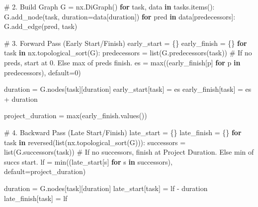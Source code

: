 \documentclass[
  letterpaper,
  DIV=11,
  numbers=noendperiod]{scrreprt}
\newenvironment{Shaded}{\begin{snugshade}}{\end{snugshade}}
\newcommand{\BuiltInTok}[1]{\textcolor[rgb]{0.00,0.23,0.31}{#1}}
\newcommand{\CommentTok}[1]{\textcolor[rgb]{0.37,0.37,0.37}{#1}}
\newcommand{\ControlFlowTok}[1]{\textcolor[rgb]{0.00,0.23,0.31}{\textbf{#1}}}
\newcommand{\DecValTok}[1]{\textcolor[rgb]{0.68,0.00,0.00}{#1}}
\newcommand{\KeywordTok}[1]{\textcolor[rgb]{0.00,0.23,0.31}{\textbf{#1}}}
\newcommand{\NormalTok}[1]{\textcolor[rgb]{0.00,0.23,0.31}{#1}}
\newcommand{\OperatorTok}[1]{\textcolor[rgb]{0.37,0.37,0.37}{#1}}
\newcommand{\StringTok}[1]{\textcolor[rgb]{0.13,0.47,0.30}{#1}}
\begin{document}
\begin{Shaded}
\begin{Highlighting}[]
\CommentTok{\# 2. Build Graph}
\NormalTok{G }\OperatorTok{=}\NormalTok{ nx.DiGraph()}
\ControlFlowTok{for}\NormalTok{ task, data }\KeywordTok{in}\NormalTok{ tasks.items():}
\NormalTok{    G.add\_node(task, duration}\OperatorTok{=}\NormalTok{data[}\StringTok{\textquotesingle{}duration\textquotesingle{}}\NormalTok{])}
    \ControlFlowTok{for}\NormalTok{ pred }\KeywordTok{in}\NormalTok{ data[}\StringTok{\textquotesingle{}predecessors\textquotesingle{}}\NormalTok{]:}
\NormalTok{        G.add\_edge(pred, task)}

\CommentTok{\# 3. Forward Pass (Early Start/Finish)}
\NormalTok{early\_start }\OperatorTok{=}\NormalTok{ \{\}}
\NormalTok{early\_finish }\OperatorTok{=}\NormalTok{ \{\}}
\ControlFlowTok{for}\NormalTok{ task }\KeywordTok{in}\NormalTok{ nx.topological\_sort(G):}
\NormalTok{    predecessors }\OperatorTok{=} \BuiltInTok{list}\NormalTok{(G.predecessors(task))}
    \CommentTok{\# If no preds, start at 0. Else max of preds\textquotesingle{} finish.}
\NormalTok{    es }\OperatorTok{=} \BuiltInTok{max}\NormalTok{((early\_finish[p] }\ControlFlowTok{for}\NormalTok{ p }\KeywordTok{in}\NormalTok{ predecessors), default}\OperatorTok{=}\DecValTok{0}\NormalTok{)}
    
\NormalTok{    duration }\OperatorTok{=}\NormalTok{ G.nodes[task][}\StringTok{\textquotesingle{}duration\textquotesingle{}}\NormalTok{]}
\NormalTok{    early\_start[task] }\OperatorTok{=}\NormalTok{ es}
\NormalTok{    early\_finish[task] }\OperatorTok{=}\NormalTok{ es }\OperatorTok{+}\NormalTok{ duration}

\NormalTok{project\_duration }\OperatorTok{=} \BuiltInTok{max}\NormalTok{(early\_finish.values())}

\CommentTok{\# 4. Backward Pass (Late Start/Finish)}
\NormalTok{late\_start }\OperatorTok{=}\NormalTok{ \{\}}
\NormalTok{late\_finish }\OperatorTok{=}\NormalTok{ \{\}}
\ControlFlowTok{for}\NormalTok{ task }\KeywordTok{in} \BuiltInTok{reversed}\NormalTok{(}\BuiltInTok{list}\NormalTok{(nx.topological\_sort(G))):}
\NormalTok{    successors }\OperatorTok{=} \BuiltInTok{list}\NormalTok{(G.successors(task))}
    \CommentTok{\# If no successors, finish at Project Duration. Else min of succs\textquotesingle{} start.}
\NormalTok{    lf }\OperatorTok{=} \BuiltInTok{min}\NormalTok{((late\_start[s] }\ControlFlowTok{for}\NormalTok{ s }\KeywordTok{in}\NormalTok{ successors), default}\OperatorTok{=}\NormalTok{project\_duration)}
    
\NormalTok{    duration }\OperatorTok{=}\NormalTok{ G.nodes[task][}\StringTok{\textquotesingle{}duration\textquotesingle{}}\NormalTok{]}
\NormalTok{    late\_start[task] }\OperatorTok{=}\NormalTok{ lf }\OperatorTok{{-}}\NormalTok{ duration}
\NormalTok{    late\_finish[task] }\OperatorTok{=}\NormalTok{ lf}


\end{Highlighting}
\end{Shaded}
\end{document}
